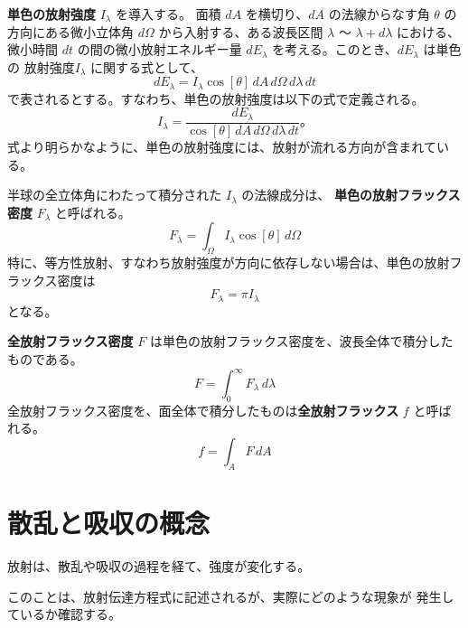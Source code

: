 \documentclass[article]{dennou777}
\newcommand{\hmemph}[1]{\textbf{#1}}
\begin{document}
\hmemph{単色の放射強度} $I_\lambda$ を導入する。
面積 $dA$ を横切り、$dA$ の法線からなす角 $\theta$ の方向にある微小立体角 $d\Omega$
から入射する、ある波長区間 $\lambda$ 〜 $\lambda+d\lambda$ における、微小時間 $dt$
の間の微小放射エネルギー量 $dE_\lambda$ を考える。このとき、$dE_\lambda$ は単色の
放射強度$I_\lambda$ に関する式として、
\begin{equation}
	dE_\lambda=I_\lambda\cos[\theta]\,dA\,d\Omega\,d\lambda\,dt
\end{equation}
で表されるとする。すなわち、単色の放射強度は以下の式で定義される。
\begin{equation}
	I_\lambda=\frac{dE_\lambda}{\cos[\theta]\,dA\,d\Omega\,d\lambda\,dt}。
\end{equation}
式より明らかなように、単色の放射強度には、放射が流れる方向が含まれている。

半球の全立体角にわたって積分された $I_\lambda$ の法線成分は、
\hmemph{単色の放射フラックス密度} $F_\lambda$ と呼ばれる。
\begin{equation}
	F_\lambda=\int_\Omega I_\lambda\cos[\theta]\,d\Omega
\end{equation}
特に、等方性放射、すなわち放射強度が方向に依存しない場合は、単色の放射フラックス密度は
\begin{equation}
	F_\lambda=\pi I_\lambda
\end{equation}
となる。

\hmemph{全放射フラックス密度} $F$ は単色の放射フラックス密度を、波長全体で積分したものである。
\begin{equation}
	F=\int^\infty_0 F_\lambda\,d\lambda
\end{equation}
全放射フラックス密度を、面全体で積分したものは\hmemph{全放射フラックス} $f$ と呼ばれる。
\begin{equation}
	f=\int_AF\,dA
\end{equation}

\section{散乱と吸収の概念}

放射は、散乱や吸収の過程を経て、強度が変化する。

このことは、放射伝達方程式に記述されるが、実際にどのような現象が
発生しているか確認する。
\end{document}

